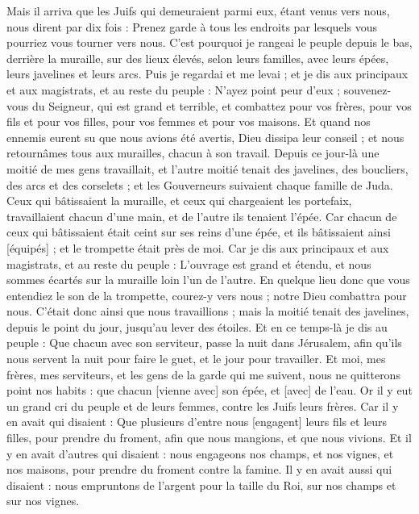 \begin{multicols}{2}
{Mais il arriva que les Juifs qui demeuraient parmi eux, étant venus vers nous, nous dirent par dix fois : Prenez garde à tous les endroits par lesquels vous pourriez vous tourner vers nous.
C'est pourquoi je rangeai le peuple depuis le bas, derrière la muraille, sur des lieux élevés, selon leurs familles, avec leurs épées, leurs javelines et leurs arcs.
Puis je regardai et me levai ; et je dis aux principaux et aux magistrats, et au reste du peuple : N'ayez point peur d'eux ; souvenez-vous du Seigneur, qui est grand et terrible, et combattez pour vos frères, pour vos fils et pour vos filles, pour vos femmes et pour vos maisons.
Et quand nos ennemis eurent su que nous avions été avertis, Dieu dissipa leur conseil ; et nous retournâmes tous aux murailles, chacun à son travail.
Depuis ce jour-là une moitié de mes gens travaillait, et l'autre moitié tenait des javelines, des boucliers, des arcs et des corselets ; et les Gouverneurs suivaient chaque famille de Juda.
Ceux qui bâtissaient la muraille, et ceux qui chargeaient les portefaix, travaillaient chacun d'une main, et de l'autre ils tenaient l'épée.
Car chacun de ceux qui bâtissaient était ceint sur ses reins d'une épée, et ils bâtissaient ainsi [équipés] ; et le trompette était près de moi.
Car je dis aux principaux et aux magistrats, et au reste du peuple : L'ouvrage est grand et étendu, et nous sommes écartés sur la muraille loin l'un de l'autre.
En quelque lieu donc que vous entendiez le son de la trompette, courez-y vers nous ; notre Dieu combattra pour nous.
C'était donc ainsi que nous travaillions ; mais la moitié tenait des javelines, depuis le point du jour, jusqu'au lever des étoiles.
Et en ce temps-là je dis au peuple : Que chacun avec son serviteur, passe la nuit dans Jérusalem, afin qu'ils nous servent la nuit pour faire le guet, et le jour pour travailler.
Et moi, mes frères, mes serviteurs, et les gens de la garde qui me suivent, nous ne quitterons point nos habits : que chacun [vienne avec] son épée, et [avec] de l'eau.
\VerseOne{}Or il y eut un grand cri du peuple et de leurs femmes, contre les Juifs leurs frères.
Car il y en avait qui disaient : Que plusieurs d'entre nous [engagent] leurs fils et leurs filles, pour prendre du froment, afin que nous mangions, et que nous vivions.
Et il y en avait d'autres qui disaient : nous engageons nos champs, et nos vignes, et nos maisons, pour prendre du froment contre la famine.
Il y en avait aussi qui disaient : nous empruntons de l'argent pour la taille du Roi, sur nos champs et sur nos vignes.
}
\end{multicols}
